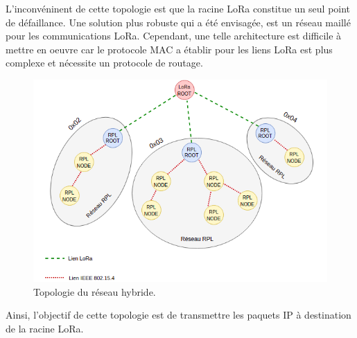 L'inconvéninent de cette topologie est que la racine LoRa constitue un seul point de défaillance. Une solution plus robuste qui a été envisagée, est un réseau maillé pour les communications LoRa. Cependant, une telle architecture est difficile à mettre en oeuvre car le protocole MAC a établir pour les liens LoRa est plus complexe et nécessite un protocole de routage.

\begin{figure}[H]
    \centering
    \includegraphics[scale=0.7]{res/pictures/loramac-topologie.drawio.png}
    \caption{Topologie du réseau hybride.}
    \label{fig:archi-topologie}
\end{figure}

Ainsi, l'objectif de cette topologie est de transmettre les paquets IP à destination de la racine LoRa.